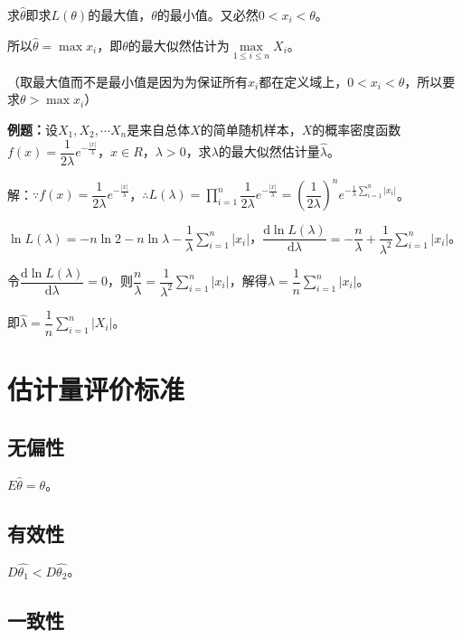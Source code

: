 求$\hat{\theta}$即求$L(\theta)$的最大值，$\theta$的最小值。又必然$0<x_i<\theta$。

所以$\hat{\theta}=\max x_i$，即$\theta$的最大似然估计为$\max\limits_{1\leqslant i\leqslant n}X_i$。

（取最大值而不是最小值是因为为保证所有$x_i$都在定义域上，$0<x_i<\theta$，所以要求$\theta>\max x_i$）

\textbf{例题：}设$X_1,X_2,\cdots X_n$是来自总体$X$的简单随机样本，$X$的概率密度函数$f(x)=\dfrac{1}{2\lambda}e^{-\frac{\vert x\vert}{\lambda}}$，$x\in R$，$\lambda>0$，求$\lambda$的最大似然估计量$\hat{\lambda}$。

解：$\because f(x)=\dfrac{1}{2\lambda}e^{-\frac{\vert x\vert}{\lambda}}$，$\therefore L(\lambda)=\prod\limits_{i=1}^n\dfrac{1}{2\lambda}e^{-\frac{\vert x\vert}{\lambda}}=\left(\dfrac{1}{2\lambda}\right)^ne^{-\frac{1}{\lambda}\sum\limits_{i=1}^n\vert x_i\vert}$。

$\ln L(\lambda)=-n\ln2-n\ln\lambda-\dfrac{1}{\lambda}\sum\limits_{i=1}^n\vert x_i\vert$，$\dfrac{\textrm{d}\ln L(\lambda)}{\textrm{d}\lambda}=-\dfrac{n}{\lambda}+\dfrac{1}{\lambda^2}\sum\limits_{i=1}^n\vert x_i\vert$。

令$\dfrac{\textrm{d}\ln L(\lambda)}{\textrm{d}\lambda}=0$，则$\dfrac{n}{\lambda}=\dfrac{1}{\lambda^2}\sum\limits_{i=1}^n\vert x_i\vert$，解得$\lambda=\dfrac{1}{n}\sum\limits_{i=1}^n\vert x_i\vert$。

即$\hat{\lambda}=\dfrac{1}{n}\sum\limits_{i=1}^n\vert X_i\vert$。

\section{估计量评价标准}

\subsection{无偏性}

$E\hat{\theta}=\theta$。

\subsection{有效性}

$D\hat{\theta_1}<D\hat{\theta_2}$。

\subsection{一致性}

